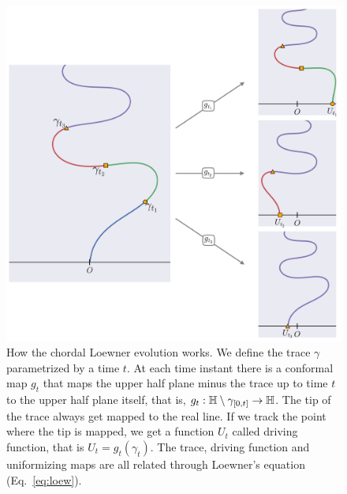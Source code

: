 \begin{figure}
\begin{center}
    \includegraphics[scale=0.4]{chapters/ch4-sle/figs/loewexplain}
\end{center}
\caption{How the chordal Loewner evolution works. We define the trace $\gamma$
    parametrized by a time $t$. At each time instant there is a conformal map
    $g_t$ that maps the upper half plane minus the trace up to time $t$ to the
    upper half plane itself, that is, $g_t:\mathbb{H}\setminus\gamma_{[0,t]}
    \rightarrow\mathbb{H}$. The tip of the trace always get mapped to the real line.
    If we track the point where the tip is mapped, we get a function $U_t$
    called driving function, that is $U_t=g_t\left(\gamma_t\right)$.
    The trace, driving function and uniformizing maps are all related through
    Loewner's equation (Eq.~\ref{eq:loew}).}
\label{fig:loewexplain}
\end{figure}

